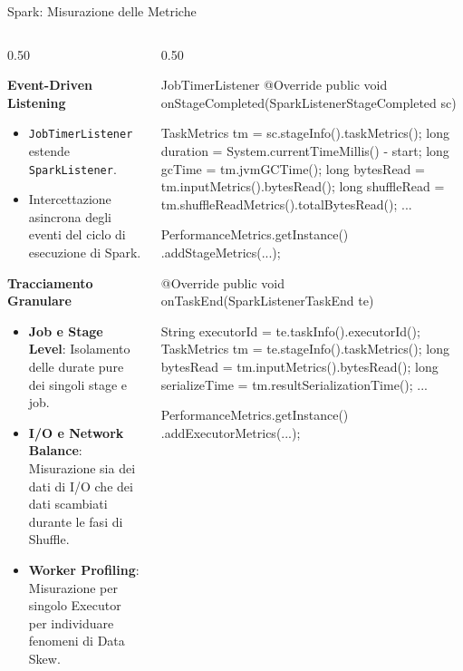 \documentclass[10pt, aspectratio=169]{beamer}
\begin{document}
\begin{frame}[fragile]{Spark: Misurazione delle Metriche}
    \begin{columns}[c]

        \begin{column}{0.50\textwidth}

            \textbf{Event-Driven Listening}
            \begin{itemize}
                \item \texttt{JobTimerListener} estende \texttt{SparkListener}.
                \item Intercettazione asincrona degli eventi del ciclo di esecuzione di Spark.
            \end{itemize}

            \textbf{Tracciamento Granulare}
            \begin{itemize}
                \item \textbf{Job e Stage Level}: Isolamento delle durate pure dei singoli stage e job.
                \item \textbf{I/O e Network Balance}: Misurazione sia dei dati di I/O che dei dati scambiati durante le fasi di Shuffle.
                \item \textbf{Worker Profiling}: Misurazione per singolo Executor per individuare fenomeni di Data Skew.
            \end{itemize}
        \end{column}

        \begin{column}{0.50\textwidth}
            \begin{appcodebox}{JobTimerListener}
@Override
public void onStageCompleted(SparkListenerStageCompleted sc) {
    TaskMetrics tm = sc.stageInfo().taskMetrics();
    long duration = System.currentTimeMillis() - start;
    long gcTime = tm.jvmGCTime();
    long bytesRead = tm.inputMetrics().bytesRead();
    long shuffleRead = tm.shuffleReadMetrics().totalBytesRead();
    ...

    PerformanceMetrics.getInstance()
        .addStageMetrics(...);
}

@Override
public void onTaskEnd(SparkListenerTaskEnd te) {
    String executorId = te.taskInfo().executorId();
    TaskMetrics tm = te.stageInfo().taskMetrics();
    long bytesRead = tm.inputMetrics().bytesRead();
    long serializeTime = tm.resultSerializationTime();
    ...

    PerformanceMetrics.getInstance()
        .addExecutorMetrics(...);
}
            \end{appcodebox}
        \end{column}

    \end{columns}
\end{frame}
\end{document}
